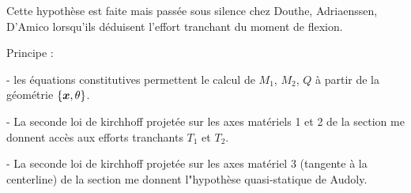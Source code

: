 Cette hypothèse est faite mais passée sous silence chez Douthe, Adriaenssen, D'Amico lorsqu'ils déduisent l'effort tranchant du moment de flexion.

Principe :

- les équations constitutives permettent le calcul de $M_1$, $M_2$, $Q$ à partir de la géométrie $\{\boldsymbol{x},\theta\}$.

- La seconde loi de kirchhoff projetée sur les axes matériels 1 et 2 de la section me donnent accès aux efforts tranchants $T_1$ et $T_2$.

- La seconde loi de kirchhoff projetée sur les axes matériel 3 (tangente à la centerline) de la section me donnent l"hypothèse quasi-statique de Audoly.






